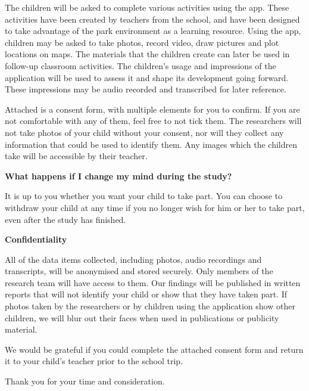 The children will be asked to complete various activities using the app. These activities have been created by teachers from the school, and have been designed to take advantage of the park environment as a learning resource. Using the app, children may be asked to take photos, record video, draw pictures and plot locations on maps. The materials that the children create can later be used in follow-up classroom activities. The children’s usage and impressions of the application will be used to assess it and shape its development going forward. These impressions may be audio recorded and transcribed for later reference. 

Attached is a consent form, with multiple elements for you to confirm. If you are not comfortable with any of them, feel free to not tick them. The researchers will not take photos of your child without your consent, nor will they collect any information that could be used to identify them. Any images which the children take will be accessible by their teacher.  

\vspace{5mm}

\textbf{What happens if I change my mind during the study?}

It is up to you whether you want your child to take part. You can choose to withdraw your child at any time if you no longer wish for him or her to take part, even after the study has finished.  

\vspace{5mm}

\textbf{Confidentiality} 

All of the data items collected, including photos, audio recordings and transcripts, will be anonymised and stored securely. Only members of the research team will have access to them. Our findings will be published in written reports that will not identify your child or show that they have taken part. If photos taken by the researchers or by children using the application show other children, we will blur out their faces when used in publications or publicity material.  

\vspace{5mm}

We would be grateful if you could complete the attached consent form and return it to your child’s teacher prior to the school trip. 

\vspace{5mm}

Thank you for your time and consideration.   

